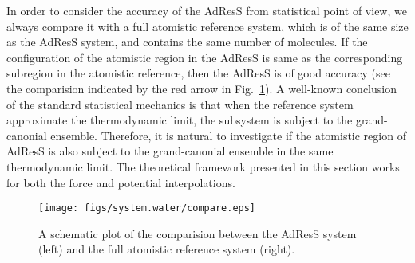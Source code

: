 \documentclass[epjST]{svjour}
\newcommand{\recheck}[1]{{\color{red} #1}}
\begin{document}
In order to consider the accuracy of the AdResS from statistical point of view, we always compare it with a full
atomistic reference system, which is of the same size as the AdResS system,
and contains the same number of molecules.
If the configuration of the atomistic region in the AdResS 
is same as the corresponding subregion in the atomistic reference, then
the AdResS  is of good accuracy (see the comparision indicated by the red arrow in Fig.~\ref{fig:compare}).
A well-known conclusion of the standard statistical mechanics is that
when the reference system approximate the thermodynamic limit, the subsystem is
subject to the grand-canonial ensemble. Therefore, it is natural to investigate
if the atomistic region of AdResS is also subject to the grand-canonial ensemble
in the same thermodynamic limit. The theoretical framework presented in this section works for
both the force and potential interpolations.

\begin{figure}
  \centering
  \texttt{[image: figs/system.water/compare.eps]}
  \caption{A schematic plot of the comparision between the AdResS system (left) and the full atomistic reference system (right).}
  \label{fig:compare}
\end{figure}
\end{document}
